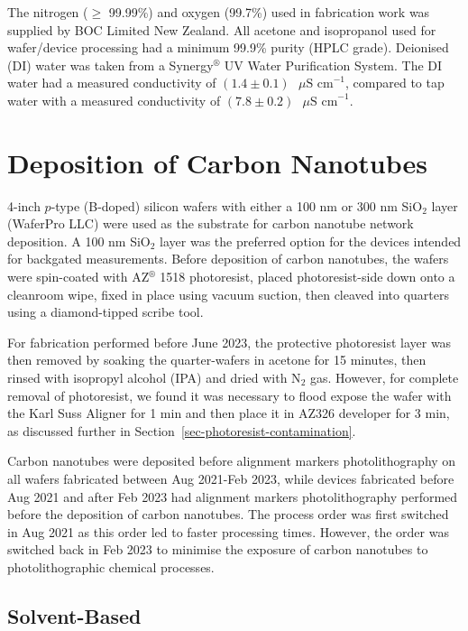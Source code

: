 \documentclass[
  a4paper,
]{scrbook}
\begin{document}
The nitrogen (\(\geq\) 99.99\%) and oxygen (99.7\%) used in fabrication
work was supplied by BOC Limited New Zealand. All acetone and
isopropanol used for wafer/device processing had a minimum 99.9\% purity
(HPLC grade). Deionised (DI) water was taken from a
Synergy\(^\circledR\) UV Water Purification System. The DI water had a
measured conductivity of
\((1.4\pm0.1)\textrm{ } \mu \textrm{S cm}^{-1}\), compared to tap water
with a measured conductivity of
\((7.8\pm0.2)\textrm{ } \mu \textrm{S cm}^{-1}\).

\hypertarget{sec-dep-carbon-nanotubes}{%
\section{Deposition of Carbon
Nanotubes}\label{sec-dep-carbon-nanotubes}}

4-inch \(p\)-type (B-doped) silicon wafers with either a 100 nm or 300
nm SiO\(_2\) layer (WaferPro LLC) were used as the substrate for carbon
nanotube network deposition. A 100 nm SiO\(_2\) layer was the preferred
option for the devices intended for backgated measurements. Before
deposition of carbon nanotubes, the wafers were spin-coated with
AZ\(^\circledR\) 1518 photoresist, placed photoresist-side down onto a
cleanroom wipe, fixed in place using vacuum suction, then cleaved into
quarters using a diamond-tipped scribe tool.

For fabrication performed before June 2023, the protective photoresist
layer was then removed by soaking the quarter-wafers in acetone for 15
minutes, then rinsed with isopropyl alcohol (IPA) and dried with N\(_2\)
gas. However, for complete removal of photoresist, we found it was
necessary to flood expose the wafer with the Karl Suss Aligner for 1 min
and then place it in AZ326 developer for 3 min, as discussed further in
Section~\ref{sec-photoresist-contamination}.

Carbon nanotubes were deposited before alignment markers
photolithography on all wafers fabricated between Aug 2021-Feb 2023,
while devices fabricated before Aug 2021 and after Feb 2023 had
alignment markers photolithography performed before the deposition of
carbon nanotubes. The process order was first switched in Aug 2021 as
this order led to faster processing times. However, the order was
switched back in Feb 2023 to minimise the exposure of carbon nanotubes
to photolithographic chemical processes.

\hypertarget{solvent-based}{%
\subsection{Solvent-Based}\label{solvent-based}}
\end{document}
